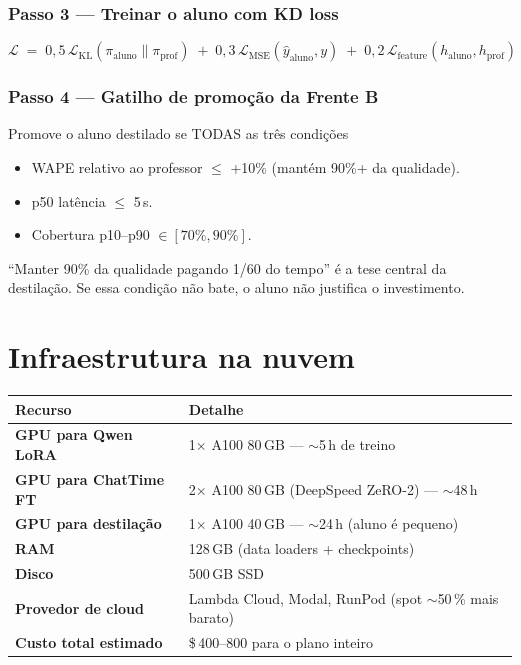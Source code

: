 \documentclass[11pt,a4paper]{article}
\begin{document}
\subsubsection{Passo 3 --- Treinar o aluno com KD loss}

\begin{equation}
\mathcal{L} \;=\; 0{,}5\,\mathcal{L}_\text{KL}(\pi_\text{aluno}\|\pi_\text{prof})
              \;+\; 0{,}3\,\mathcal{L}_\text{MSE}(\hat{y}_\text{aluno},y)
              \;+\; 0{,}2\,\mathcal{L}_\text{feature}(h_\text{aluno},h_\text{prof})
\end{equation}

\subsubsection{Passo 4 --- Gatilho de promoção da Frente B}

\begin{infobox}{Promove o aluno destilado se TODAS as três condições}
\begin{itemize}[leftmargin=*]
\item WAPE relativo ao professor $\le$ +10\% (mantém 90\%+ da qualidade).
\item p50 latência $\le$ 5\,s.
\item Cobertura p10--p90 $\in [70\%, 90\%]$.
\end{itemize}
``Manter 90\% da qualidade pagando 1/60 do tempo'' é a tese central da
destilação. Se essa condição não bate, o aluno não justifica o
investimento.
\end{infobox}

\section{Infraestrutura na nuvem}

\begin{table}[h!]
\centering
\small
\begin{tabularx}{\textwidth}{@{}l X@{}}
\toprule
\textbf{Recurso} & \textbf{Detalhe} \\
\midrule
\textbf{GPU para Qwen LoRA}  & 1$\times$ A100 80\,GB --- $\sim$5\,h de treino \\
\textbf{GPU para ChatTime FT}& 2$\times$ A100 80\,GB (DeepSpeed ZeRO-2) --- $\sim$48\,h \\
\textbf{GPU para destilação} & 1$\times$ A100 40\,GB --- $\sim$24\,h (aluno é pequeno) \\
\textbf{RAM}                 & 128\,GB (data loaders + checkpoints) \\
\textbf{Disco}               & 500\,GB SSD \\
\textbf{Provedor de cloud}   & Lambda Cloud, Modal, RunPod (spot $\sim$50\,\% mais barato) \\
\textbf{Custo total estimado}& \$\,400--800 para o plano inteiro \\
\bottomrule
\end{tabularx}
\end{table}
\end{document}
